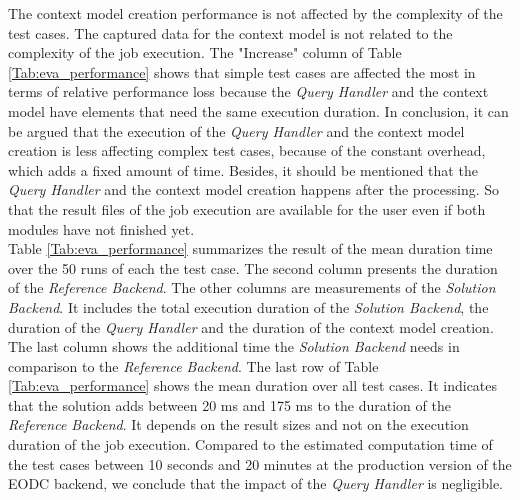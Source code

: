 \documentclass[draft,final]{vutinfth} %
\newcommand{\bgoesswein}[1]{{\color{blue}#1}}
\begin{document}
The context model creation performance is not affected by the complexity of the test cases. The captured data for the context model is not related to the complexity of the job execution. The "Increase" column of Table \ref{Tab:eva_performance} shows that simple test cases are affected the most in terms of relative performance loss because the \textit{Query Handler} and the context model have elements that need the same execution duration. In conclusion, it can be argued that the execution of the \textit{Query Handler} and the context model creation is less affecting complex test cases, \bgoesswein{because of the constant overhead, which adds a fixed amount of time}. Besides, it should be mentioned that the \textit{Query Handler} and the context model creation happens after the processing. So that the result files of the job execution are available for the user even if both modules have not finished yet. \\
Table \ref{Tab:eva_performance} summarizes the result of the mean duration time over the 50 runs of each the test case. The second column presents the duration of the \textit{Reference Backend}. The other columns are measurements of the \textit{Solution Backend}. It includes the total execution duration of the \textit{Solution Backend}, the duration of the \textit{Query Handler} and the duration of the context model creation. The last column shows the additional time the \textit{Solution Backend} needs in comparison to the \textit{Reference Backend}. The last row of Table \ref{Tab:eva_performance} shows the mean duration over all test cases. It indicates that the solution adds between 20 ms and 175 ms to the duration of the \textit{Reference Backend}. It depends on the result sizes and not on the execution duration of the job execution. Compared to the estimated computation time of the test cases between 10 seconds and 20 minutes at the production version of the EODC backend, we conclude that the impact of the \textit{Query Handler} is negligible.
\end{document}

